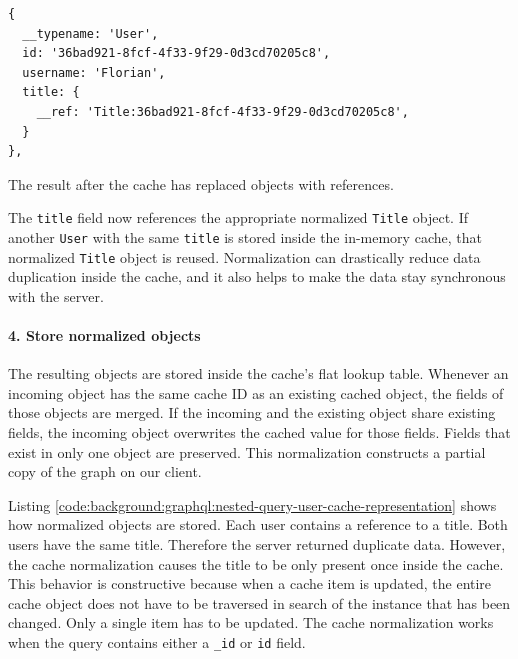 \ifshowListings
\begin{listing}[H]
    \begin{verbatim}
{
  __typename: 'User',
  id: '36bad921-8fcf-4f33-9f29-0d3cd70205c8',
  username: 'Florian',
  title: {
    __ref: 'Title:36bad921-8fcf-4f33-9f29-0d3cd70205c8',
  }
},
    \end{verbatim}
    \caption{The result after the cache has replaced objects with references.}\label{code:background:graphql:nested-query-response-after-replacement}
\end{listing}
\fi

\noindent The \texttt{title} field now references the appropriate normalized \texttt{Title} object. If another \texttt{User} with the same \texttt{title} is stored inside the in-memory cache, that normalized \texttt{Title} object is reused. Normalization can drastically reduce data duplication inside the cache, and it also helps to make the data stay synchronous with the server.

\paragraph{4. Store normalized objects}\label{paragraph:background:graphql:apollo-server-client:data-normalization:store-normalized-objects}

The resulting objects are stored inside the cache's flat lookup table. Whenever an incoming object has the same cache ID as an existing cached object, the fields of those objects are merged. If the incoming and the existing object share existing fields, the incoming object overwrites the cached value for those fields. Fields that exist in only one object are preserved. This normalization constructs a partial copy of the graph on our client. \cite{misc:-:background:graphql:apollo-client-cache-overview}

\bigskip

\noindent Listing \ref{code:background:graphql:nested-query-user-cache-representation} shows how normalized objects are stored. Each user contains a reference to a title. Both users have the same title. Therefore the server returned duplicate data. However, the cache normalization causes the title to be only present once inside the cache. This behavior is constructive because when a cache item is updated, the entire cache object does not have to be traversed in search of the instance that has been changed. Only a single item has to be updated. The cache normalization works when the query contains either a \texttt{\_id} or \texttt{id} field.

